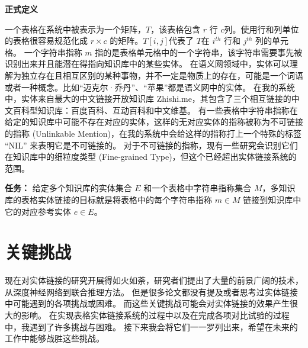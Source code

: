 \noindent\textbf{正式定义}

一个表格在系统中被表示为一个矩阵，$T$，该表格包含 $r$ 行 $c$列。使用行和列单位的表格很容易规范化成 $r\times{c}$ 的矩阵。$T[i,j]$代表了 $T$在 $i^{th}$ 行和 $j^{th}$ 列的单元格。
一个字符串指称 $m$ 指的是表格单元格中的一个字符串，该字符串需要事先被识别出来并且能潜在得指向知识库中的某些实体。
在语义网领域中，实体可以理解为独立存在且相互区别的某种事物，并不一定是物质上的存在，可能是一个词语或者一种概念。比如``迈克尔·乔丹''、``苹果''都是语义网中的实体。
在我的系统中，实体来自最大的中文链接开放知识库 Zhishi.me\cite{niu2011zhishi}，其包含了三个相互链接的中文百科型知识库：百度百科、互动百科和中文维基。
有一些表格中字符串指称在给定的知识库中可能不存在对应的实体，这样的无对应实体的指称被称为不可链接的指称 (Unlinkable Mention)，在我的系统中会给这样的指称打上一个特殊的标签 ``NIL'' 来表明它是不可链接的。
对于不可链接的指称，现有一些研究\cite{shen2012graph}\cite{ling2012fine}会识别它们在知识库中的细粒度类型 (Fine-grained Type)，但这个已经超出实体链接系统的范围。\newline

\noindent\textbf{任务：} 给定多个知识库的实体集合 $E$ 和一个表格中字符串指称集合 $M$，多知识库的表格实体链接的目标就是将表格中的每个字符串指称 $m \in M$ 链接到知识库中它的对应参考实体 $e \in E$。


\section{关键挑战}\label{challenge}

现在对实体链接的研究开展得如火如荼，研究者们提出了大量的前景广阔的技术，从深度神经网络到联合推理方法。
但是很多论文都没有提及或者思考过实体链接中可能遇到的各项挑战或困难。
而这些关键挑战可能会对实体链接的效果产生很大的影响。
在实现表格实体链接系统的过程中以及在完成各项对比试验的过程中，我遇到了许多挑战与困难。
接下来我会将它们一一罗列出来，希望在未来的工作中能够战胜这些挑战。\par

